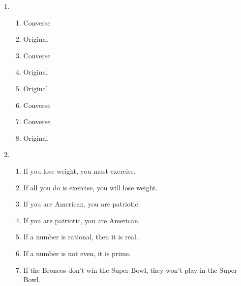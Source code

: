 \begin{enumerate}
\begin{enumerate}
            \end{enumerate}
        \item 
            \begin{enumerate}
                \item Converse
                \item Original
                \item Converse
                \item Original
                \item Original
                \item Converse
                \item Converse
                \item Original
            \end{enumerate}
        \item
            \begin{enumerate}
                \item If you lose weight, you must exercise.
                \item If all you do is exercise, you will lose weight.
                \item If you are American, you are patriotic.
                \item If you are patriotic, you are American.
                \item If a number is rational, then it is real.
                \item If a number is not even, it is prime.
                \item If the Broncos don't win the Super Bowl, they won't play in the Super Bowl.
            \end{enumerate}
    \end{enumerate}